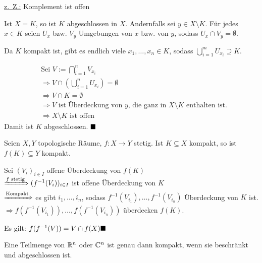 \begin{beweis}
    \underline{z.~Z.:} Komplement ist offen

    Ist $X = K$, so ist $K$ abgeschlossen in $X$. Andernfalls sei 
    $y \in X \setminus K$. Für jedes $x \in K$ seien $U_x$ bzw. $V_y$
    Umgebungen von $x$ bzw. von $y$, sodass $U_x \cap V_y = \emptyset$.

    \begin{figure}[htp]
        \centering
        
    \end{figure}

    Da $K$ kompakt ist, gibt es endlich viele $x_1, \dots, x_n \in K$,
    sodass $\bigcup_{i=1}^m U_{x_i} \supseteq K$.

    \begin{align*}
        &\text{Sei } V := \bigcap_{i=1}^n V_{x_i}\\
        &\Rightarrow V \cap \left (\bigcup_{i=1}^n U_{x_i} \right) = \emptyset \\
        &\Rightarrow V \cap K = \emptyset\\
        &\Rightarrow V \text{ ist Überdeckung von } y\text{, die ganz in } X \setminus K \text{ enthalten ist}.\\
        &\Rightarrow X \setminus K \text{ ist offen}
    \end{align*}
    Damit ist $K$ abgeschlossen. $\qed$
\end{beweis}

\begin{korollar}
    Seien $X, Y$ topologische Räume, $f: X \rightarrow Y$ stetig.
    Ist $K \subseteq X$ kompakt, so ist $f(K) \subseteq Y$ kompakt.
\end{korollar}

\begin{beweis}
    Sei $(V_i)_{i \in I}$ offene Überdeckung von $f(K)$\\
    $\xRightarrow{f \text{ stetig}} (f^{-1}(V_i))_{i \in I}$ ist offene Überdeckung von $K$\\
    $\xRightarrow{\text{Kompakt}}$ es gibt $i_1, \dots, i_n$, 
    sodass $f^{-1}(V_{i_1}), \dots, f^{-1}(V_{i_n})$ Überdeckung von
    $K$ ist.\\
    $\Rightarrow f(f^{-1}( V_{i_1})), \dots, f(f^{-1}(V_{i_n}))$ 
    überdecken $f(K)$.

    Es gilt: $f(f^{-1}(V)) = V \cap f(X) \qed$
\end{beweis}

\begin{satz}
    Eine Teilmenge von $\mathbb{R}^n$ oder $\mathbb{C}^n$ ist genau dann kompakt,
    wenn sie beschränkt und abgeschlossen ist.
\end{satz}

